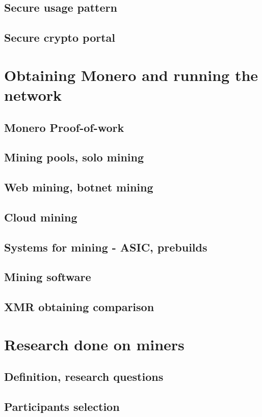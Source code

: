 \documentclass[
  printed, %
  table,   %
  nolof,     %
  nolot,     %
           oneside, color
]{fithesis3}
\begin{document}
\section{Secure usage pattern}
\section{Secure crypto portal}



\chapter{Obtaining Monero and running the network}
\section{Monero Proof-of-work}
\section{Mining pools, solo mining}
\section{Web mining, botnet mining}
\section{Cloud mining}
\section{Systems for mining - ASIC, prebuilds}
\section{Mining software}
\section{XMR obtaining comparison}

\chapter{Research done on miners}
\section{Definition, research questions}
\section{Participants selection}
\end{document}
